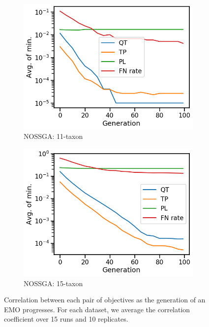 \begin{figure}[!htbp]
\begin{adjustwidth}{-1cm}{-1cm}
\begin{subfigure}[b]{0.4\textwidth}
			\includegraphics[width=\textwidth]{Figure/11-taxon_NOSSGA_minimum}
			\caption{NOSSGA: 11-taxon}
		\end{subfigure}%
		\begin{subfigure}[b]{0.4\textwidth}
			\includegraphics[width=\textwidth]{Figure/15-taxon_NOSSGA_minimum}
			\caption{NOSSGA: 15-taxon}
		\end{subfigure}
		\caption{Correlation between each pair of objectives as the generation of an EMO progresses. For each dataset, we average the correlation coefficient over 15 runs and 10 replicates.}
		\label{fig:gen_wise_correlation}
	\end{adjustwidth}
\end{figure}

